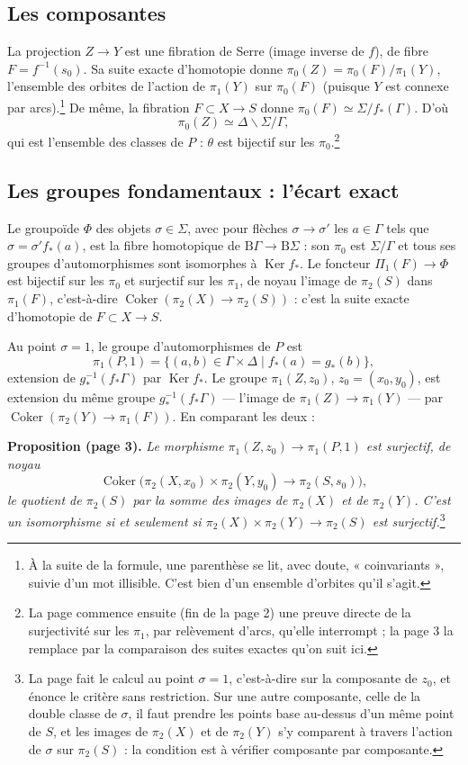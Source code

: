\documentclass[11pt,a4paper]{article}
\begin{document}
\subsection*{Les composantes}

La projection $Z \to Y$ est une fibration de Serre (image inverse de $f$), de
fibre $F = f^{-1}(s_0)$. Sa suite exacte d'homotopie donne
$\pi_0(Z) = \pi_0(F) / \pi_1(Y)$, l'ensemble des orbites de l'action de
$\pi_1(Y)$ sur $\pi_0(F)$ (puisque $Y$ est connexe par arcs).\footnote{À la
suite de la formule, une parenthèse se lit, avec doute, « coinvariants »,
suivie d'un mot illisible. C'est bien d'un ensemble d'orbites qu'il s'agit.}
De même, la fibration $F \subset X \to S$ donne $\pi_0(F) \simeq \Sigma /
f_*(\Gamma)$. D'où
\[
  \pi_0(Z) \simeq \Delta \backslash \Sigma / \Gamma ,
\]
qui est l'ensemble des classes de $P$ : $\theta$ est bijectif sur les
$\pi_0$.\footnote{La page commence ensuite (fin de la page 2) une preuve
directe de la surjectivité sur les $\pi_1$, par relèvement d'arcs, qu'elle
interrompt ; la page 3 la remplace par la comparaison des suites exactes
qu'on suit ici.}

\subsection*{Les groupes fondamentaux : l'écart exact}

Le groupoïde $\Phi$ des objets $\sigma \in \Sigma$, avec pour flèches
$\sigma \to \sigma'$ les $a \in \Gamma$ tels que $\sigma = \sigma' f_*(a)$, est
la fibre homotopique de $\mathrm{B}\Gamma \to \mathrm{B}\Sigma$ : son $\pi_0$
est $\Sigma / \Gamma$ et tous ses groupes d'automorphismes sont isomorphes à
$\operatorname{Ker} f_*$. Le foncteur $\Pi_1(F) \to \Phi$ est bijectif sur
les $\pi_0$ et surjectif sur les $\pi_1$, de noyau l'image de $\pi_2(S)$
dans $\pi_1(F)$, c'est-à-dire $\operatorname{Coker}(\pi_2(X) \to \pi_2(S))$ :
c'est la suite exacte d'homotopie de $F \subset X \to S$.

Au point $\sigma = 1$, le groupe d'automorphismes de $P$ est
\[
  \pi_1(P, 1) = \{ (a, b) \in \Gamma \times \Delta \mid f_*(a) = g_*(b) \} ,
\]
extension de $g_*^{-1}(f_*\Gamma)$ par $\operatorname{Ker} f_*$. Le groupe
$\pi_1(Z, z_0)$, $z_0 = (x_0, y_0)$, est extension du même groupe
$g_*^{-1}(f_*\Gamma)$ — l'image de $\pi_1(Z) \to \pi_1(Y)$ — par
$\operatorname{Coker}(\pi_2(Y) \to \pi_1(F))$. En comparant les deux :

\textbf{Proposition (page 3).} \emph{Le morphisme $\pi_1(Z, z_0) \to
\pi_1(P, 1)$ est surjectif, de noyau
\[
  \operatorname{Coker}\bigl(\pi_2(X, x_0) \times \pi_2(Y, y_0)
  \longrightarrow \pi_2(S, s_0)\bigr) ,
\]
le quotient de $\pi_2(S)$ par la somme des images de $\pi_2(X)$ et de
$\pi_2(Y)$. C'est un isomorphisme si et seulement si $\pi_2(X) \times
\pi_2(Y) \to \pi_2(S)$ est surjectif.}\footnote{La page fait le calcul au
point $\sigma = 1$, c'est-à-dire sur la composante de $z_0$, et énonce le
critère sans restriction. Sur une autre composante, celle de la double classe
de $\sigma$, il faut prendre les points base au-dessus d'un même point de
$S$, et les images de $\pi_2(X)$ et de $\pi_2(Y)$ s'y comparent à travers
l'action de $\sigma$ sur $\pi_2(S)$ : la condition est à vérifier composante
par composante.}
\end{document}
